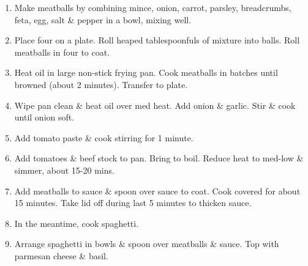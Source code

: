\documentclass[11pt,a4paper]{article}
\begin{document}
\begin{enumerate}

  \item Make meatballs by combining mince, onion, carrot, parsley, breadcrumbs,
    feta, egg, salt {\&} pepper in a bowl, mixing well.

  \item Place four on a plate. Roll heaped tablespoonfuls of mixture into balls.
    Roll meatballs in four to coat.

  \item Heat oil in large non-stick frying pan. Cook meatballs in batches until
    browned (about 2 minutes). Transfer to plate.

  \item Wipe pan clean {\&} heat oil over med heat. Add onion {\&} garlic. Stir
    {\&} cook until onion soft.

  \item Add tomato paste {\&} cook stirring for 1 minute.

  \item Add tomatoes {\&} beef stock to pan. Bring to boil. Reduce heat to
    med-low {\&} simmer, about 15-20 mins.

  \item Add meatballs to sauce {\&} spoon over sauce to coat. Cook covered for
    about 15 minutes. Take lid off during last 5 minutes to thicken sauce.

  \item In the meantime, cook spaghetti.

  \item Arrange spaghetti in bowls {\&} spoon over meatballs {\&} sauce. Top
    with parmesan cheese {\&} basil.

\end{enumerate}
\end{document}

